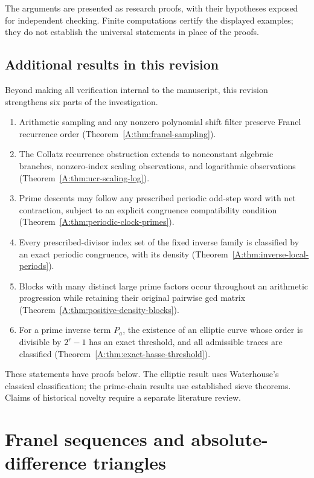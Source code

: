 \documentclass[11pt,a4paper]{article}
\theoremstyle{definition}
\theoremstyle{remark}
\numberwithin{equation}{section}
\begin{document}
The arguments are presented as research proofs, with their hypotheses exposed
for independent checking. Finite computations certify the displayed examples;
they do not establish the universal statements in place of the proofs.


\subsection{Additional results in this revision}
Beyond making all verification internal to the manuscript, this revision
strengthens six parts of the investigation.
\begin{enumerate}
\item Arithmetic sampling and any nonzero polynomial shift filter preserve
Franel recurrence order (Theorem~\ref{A:thm:franel-sampling}).
\item The Collatz recurrence obstruction extends to nonconstant algebraic
branches, nonzero-index scaling observations, and logarithmic observations
(Theorem~\ref{A:thm:ucr-scaling-log}).
\item Prime descents may follow any prescribed periodic odd-step word with
net contraction, subject to an explicit congruence compatibility condition
(Theorem~\ref{A:thm:periodic-clock-primes}).
\item Every prescribed-divisor index set of the fixed inverse family is
classified by an exact periodic congruence, with its density
(Theorem~\ref{A:thm:inverse-local-periods}).
\item Blocks with many distinct large prime factors occur throughout an
arithmetic progression while retaining their original pairwise gcd matrix
(Theorem~\ref{A:thm:positive-density-blocks}).
\item For a prime inverse term $P_a$, the existence of an elliptic curve whose
order is divisible by $2^r-1$ has an exact threshold, and all admissible
traces are classified (Theorem~\ref{A:thm:exact-hasse-threshold}).
\end{enumerate}
These statements have proofs below. The elliptic result uses Waterhouse's
classical classification; the prime-chain results use established sieve
theorems. Claims of historical novelty require a separate literature review.


\section{Franel sequences and absolute-difference triangles}
\label{A:sec:fg}
\end{document}
